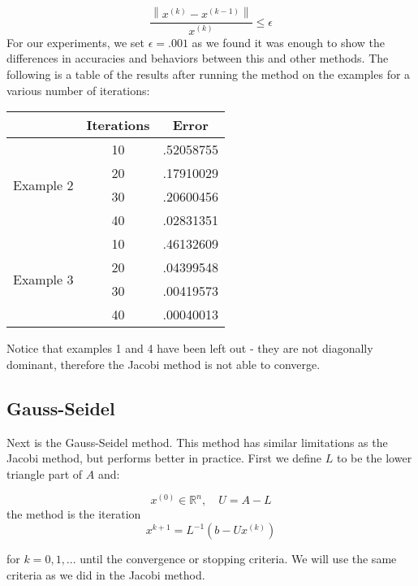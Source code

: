 \documentclass[11pt]{article}	%
\newcommand\norm[1]{\left\lVert#1\right\rVert}
\begin{document}
    \begin{equation}
        \frac{\norm{x^{(k)} - x^{(k-1)}}}{x^{(k)}} \leq \epsilon
    \end{equation}
    For our experiments, we set $\epsilon = .001$ as we found it was enough to show the differences in accuracies and behaviors between this and other methods. The following is a table of the results after running the method on the examples for a various number of iterations:
    \begin{center}
        \begin{tabular}{||c|c|c||}
            \hline
            & Iterations & Error \\ [.35em]
            \hline
            \multirow{4}{5em}{Example 2} & 10 & .52058755 \\ [.25em]
            & 20 & .17910029 \\ [.25em]
            & 30 & .20600456 \\ [.25em]
            & 40 & .02831351 \\ [.25em]
            \hline
            \multirow{4}{5em}{Example 3} & 10 & .46132609 \\ [.25em]
            & 20 & .04399548 \\ [.25em]
            & 30 & .00419573 \\ [.25em]
            & 40 & .00040013 \\ [.25em]
            \hline
        \end{tabular}
    \end{center}

    Notice that examples 1 and 4 have been left out - they are not diagonally dominant, therefore the Jacobi method is not able to converge.

\pagebreak
\subsection{Gauss-Seidel}
Next is the Gauss-Seidel method. This method has similar limitations as the Jacobi method, but performs better in practice.
First we define $L$ to be the lower triangle part of $A$ and:

$$  x^{(0)}\in {\mathbb R}^n, \quad U = A - L $$
the method is the iteration
\begin{equation}\label{eq:jacobi-eq-1}
    x^{k+1} = L^{-1}(b - Ux^{(k)})
\end{equation}

for $k = 0, 1, ...$ until the convergence or stopping criteria. We will use the same criteria as we did in the Jacobi method.
\end{document}
